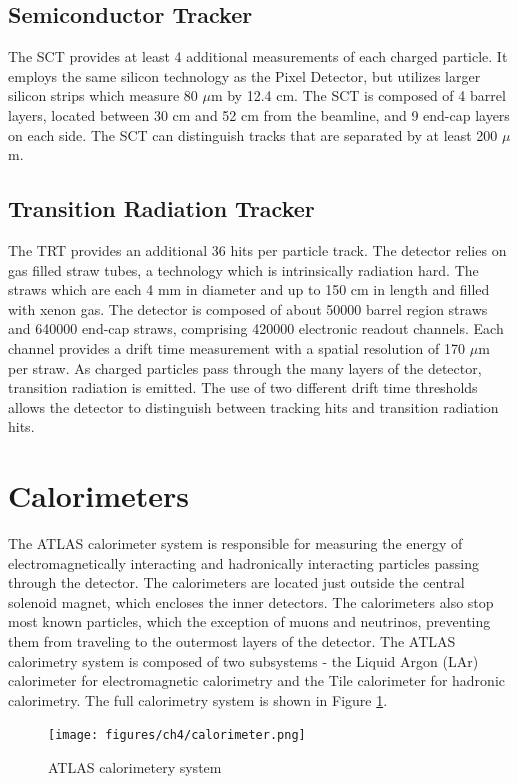\subsection{Semiconductor Tracker}
The SCT provides at least 4 additional measurements of each charged particle. It employs the same silicon technology as the Pixel Detector, but utilizes larger silicon strips which measure 80 $\mu$m by 12.4 cm. The SCT is composed of 4 barrel layers, located between 30 cm and 52 cm from the beamline, and 9 end-cap layers on each side. The SCT can distinguish tracks that are separated by at least 200 $\mu$m.

\subsection{Transition Radiation Tracker}
The TRT provides an additional 36 hits per particle track. The detector relies on gas filled straw tubes, a technology which is intrinsically radiation hard. The straws which are each 4 mm in diameter and up to 150 cm in length and filled with xenon gas. The detector is composed of about 50000 barrel region straws and 640000 end-cap straws, comprising 420000 electronic readout channels. Each channel provides a drift time measurement with a spatial resolution of 170 $\mu$m per straw. As charged particles pass through the many layers of the detector, transition radiation is emitted. The use of two different drift time thresholds allows the detector to distinguish between tracking hits and transition radiation hits. 

\section{Calorimeters}
The ATLAS calorimeter system is responsible for measuring the energy of electromagnetically interacting and hadronically interacting particles passing through the detector. The calorimeters are located just outside the central solenoid magnet, which encloses the inner detectors. The calorimeters also stop most known particles, which the exception of muons and neutrinos, preventing them from traveling to the outermost layers of the detector. The ATLAS calorimetry system is composed of two subsystems - the Liquid Argon (LAr) calorimeter for electromagnetic calorimetry and the Tile calorimeter for hadronic calorimetry. The full calorimetry system is shown in Figure \ref{fig:calorimeters}.

\begin{figure}
        \centering
	\texttt{[image: figures/ch4/calorimeter.png]}
	\caption{ATLAS calorimetery system \cite{calorimeter_img}}
	\label{fig:calorimeters}
\end{figure}

